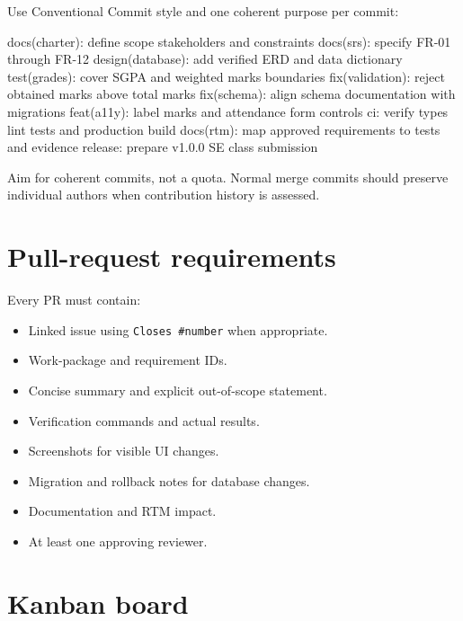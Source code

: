 \documentclass[
  10pt,
  a4paper,
  oneside]{report}
\newenvironment{Shaded}{}{}
\newcommand{\NormalTok}[1]{#1}
\providecommand{\tightlist}{%
  \setlength{\itemsep}{0pt}\setlength{\parskip}{0pt}}
\begin{document}
Use Conventional Commit style and one coherent purpose per commit:

\begin{Shaded}
\begin{Highlighting}[]
\NormalTok{docs(charter): define scope stakeholders and constraints}
\NormalTok{docs(srs): specify FR{-}01 through FR{-}12}
\NormalTok{design(database): add verified ERD and data dictionary}
\NormalTok{test(grades): cover SGPA and weighted marks boundaries}
\NormalTok{fix(validation): reject obtained marks above total marks}
\NormalTok{fix(schema): align schema documentation with migrations}
\NormalTok{feat(a11y): label marks and attendance form controls}
\NormalTok{ci: verify types lint tests and production build}
\NormalTok{docs(rtm): map approved requirements to tests and evidence}
\NormalTok{release: prepare v1.0.0 SE class submission}
\end{Highlighting}
\end{Shaded}

Aim for coherent commits, not a quota. Normal merge commits should
preserve individual authors when contribution history is assessed.

\section{Pull-request requirements}\label{94-pull-request-requirements}

Every PR must contain:

\begin{itemize}
\tightlist
\item
  Linked issue using \texttt{Closes\ \#number} when appropriate.
\item
  Work-package and requirement IDs.
\item
  Concise summary and explicit out-of-scope statement.
\item
  Verification commands and actual results.
\item
  Screenshots for visible UI changes.
\item
  Migration and rollback notes for database changes.
\item
  Documentation and RTM impact.
\item
  At least one approving reviewer.
\end{itemize}

\section{Kanban board}\label{95-kanban-board}
\end{document}
